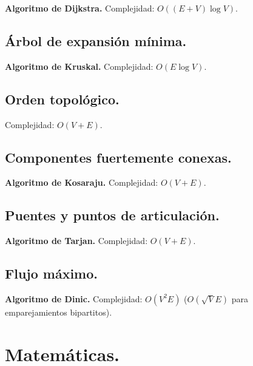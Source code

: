 \documentclass[10pt, letterpaper, twoside]{article}
\begin{document}
\textbf{Algoritmo de Dijkstra.} Complejidad: $O((E + V) \log V)$.



\subsection{Árbol de expansión mínima.}

\textbf{Algoritmo de Kruskal.} Complejidad: $O(E \log V)$.



\subsection{Orden topológico.}

Complejidad: $O(V + E)$.



\subsection{Componentes fuertemente conexas.}

\textbf{Algoritmo de Kosaraju.} Complejidad: $O(V + E)$.



\subsection{Puentes y puntos de articulación.}

\textbf{Algoritmo de Tarjan.} Complejidad: $O(V + E)$.



\subsection{Flujo máximo.}

\textbf{Algoritmo de Dinic.} Complejidad: $O(V^2 E)$ ($O(\sqrt{V} E)$ para emparejamientos bipartitos).




\section{Matemáticas.}
\end{document}
